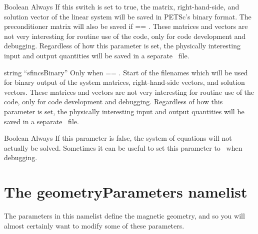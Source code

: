 \myhrule

{Boolean}
{\false}
{Always}
{If this switch is set to true, the matrix, right-hand-side, and solution vector of the
linear system will be saved in PETSc's binary format.  
The preconditioner matrix will also
be saved if  == \true.}
These matrices and vectors are not very interesting for routine use of the code,
only for code development and debugging.
Regardless of how this parameter is set,
the physically interesting input and output quantities will be saved in a
separate \HDF~file.

\myhrule

{string}
{``sfincsBinary''}
{Only when  == \true.}
{Start of the filenames which will be used for binary output of the system
matrices, right-hand-side vectors, and solution vectors.
These matrices and vectors are not very interesting for routine use of the code,
only for code development and debugging.
Regardless of how this parameter is set,
the physically interesting input and output quantities will be saved in a
separate \HDF~file.
}

\myhrule

{Boolean}
{\true}
{Always}
{If this parameter is false, the system of equations will not actually be solved.
 Sometimes it can be useful to set this parameter to \false~when debugging.
}








\section{The {\ttfamily geometryParameters} namelist}
\label{sec:geometryParameters}

The parameters in this namelist define the magnetic geometry, and so you will almost certainly want to modify some of these parameters.

\myhrule

